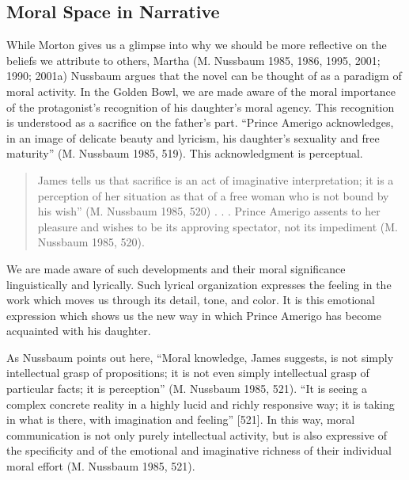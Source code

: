 \documentclass[12pt]{book}
\theoremstyle{definition}
\theoremstyle{remark}
\begin{document}
\subsection*{Moral Space in Narrative}\label{moral-space-in-narrative}

While Morton gives us a glimpse into why we should be more reflective on the beliefs we attribute to others, Martha (M. Nussbaum 1985, 1986, 1995, 2001; 1990; 2001a) Nussbaum argues that the novel can be thought of as a paradigm of moral activity. In the Golden Bowl, we are made aware of the moral importance of the protagonist's recognition of his daughter's moral agency. This recognition is understood as a sacrifice on the father's part. ``Prince Amerigo acknowledges, in an image of delicate beauty and lyricism, his daughter's sexuality and free maturity'' (M. Nussbaum 1985, 519). This acknowledgment is perceptual.

\begin{quote}
James tells us that sacrifice is an act of imaginative interpretation; it is a perception of her situation as that of a free woman who is not bound by his wish'' (M. Nussbaum 1985, 520) . . . Prince Amerigo assents to her pleasure and wishes to be its approving spectator, not its impediment (M. Nussbaum 1985, 520).
\end{quote}

We are made aware of such developments and their moral significance linguistically and lyrically. Such lyrical organization expresses the feeling in the work which moves us through its detail, tone, and color. It is this emotional expression which shows us the new way in which Prince Amerigo has become acquainted with his daughter.

As Nussbaum points out here, ``Moral knowledge, James suggests, is not simply intellectual grasp of propositions; it is not even simply intellectual grasp of particular facts; it is perception'' (M. Nussbaum 1985, 521). ``It is seeing a complex concrete reality in a highly lucid and richly responsive way; it is taking in what is there, with imagination and feeling'' {[}521{]}. In this way, moral communication is not only purely intellectual activity, but is also expressive of the specificity and of the emotional and imaginative richness of their individual moral effort (M. Nussbaum 1985, 521).
\end{document}
